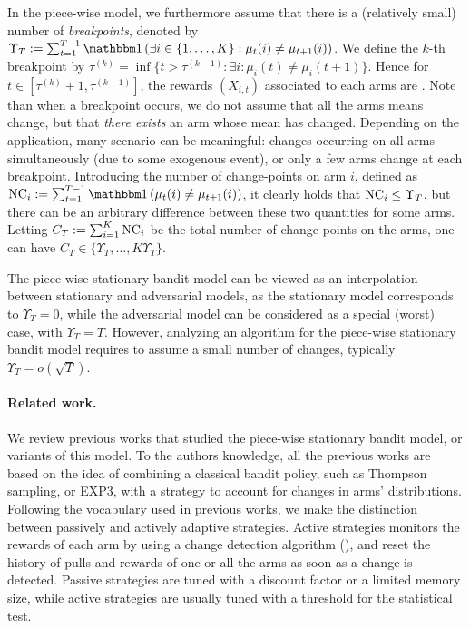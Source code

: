 In the piece-wise \iid{} model, we furthermore assume that there is a (relatively small) number of \emph{breakpoints}, denoted by $\Upsilon_T:=\sum_{t=1}^{T-1} \indic\left(\exists i\in\{1,\dots,K\}: \mu_t(i) \neq \mu_{t+1}(i)\right)$.
We define the $k$-th breakpoint by $\tau^{(k)} = \inf\{t > \tau^{(k-1)} : \exists i : \mu_i(t) \neq \mu_{i}(t+1)\}$. Hence for $t\in[\tau^{(k)} + 1,\tau^{(k+1)}]$, the rewards $(X_{i,t})$ associated to each arms are \iid.
Note than when a breakpoint occurs, we do not assume that all the arms means  change, but that \emph{there exists} an arm whose mean has changed. Depending on the application, many scenario can be meaningful: changes occurring on all arms simultaneously (due to some exogenous event), or only a few arms change at each breakpoint. Introducing the number of change-points  on arm $i$, defined as $\NCi:=\sum_{t=1}^{T-1} \indic\left(\mu_t(i) \neq \mu_{t+1}(i)\right)$, it clearly holds that
$\text{NC}_i \leq \Upsilon_T$, but there can be an arbitrary difference between these two quantities for some arms. Letting $C_T := \sum_{i=1}^K \text{NC}_i$ be the total number of change-points on the arms, one can have $C_T \in \{ \Upsilon_T, \dots, K\Upsilon_T \}$.



The piece-wise stationary bandit model can be viewed as an interpolation between stationary and adversarial models, as the stationary model corresponds to $\Upsilon_T = 0$, while the adversarial model can be considered as a special (worst) case, with $\Upsilon_T = T$. However, analyzing an algorithm for the piece-wise stationary bandit model requires to assume a small number of changes, typically $\Upsilon_T = o(\sqrt{T})$.

\paragraph{Related work.}

We review previous works that studied the piece-wise stationary bandit model, or variants of this model.
To the authors knowledge, all the previous works are based on the idea of combining a classical bandit policy, such as Thompson sampling, \UCB{} or EXP3, with a strategy to account for changes in arms' distributions.
Following the vocabulary used in previous works, we make the distinction between passively and actively adaptive strategies.
Active strategies monitors the rewards of each arm by using a change detection algorithm (\cite{Basseville93}), and reset the history of pulls and rewards of one or all the arms as soon as a change is detected.
Passive strategies are tuned with a discount factor or a limited memory size, while active strategies are usually tuned with a threshold for the statistical test.

